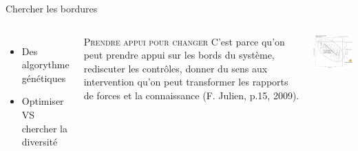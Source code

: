 \documentclass[newPxFont]{beamer}
\begin{document}
\begin{frame}[c]{Chercher les bordures}
  \vspace{-1cm}
  \begin{columns}[onlytextwidth,T]
    \column{\dimexpr\linewidth-30mm-5mm}
        \begin{itemize}
          \item Des algorythme génétiques
          \item Optimiser VS chercher la diversité
        \end{itemize}
        \begin{alertblock}{\textsc{Prendre appui pour changer}}
          C'est parce qu'on peut prendre appui sur les bords du système, rediscuter les contrôles, donner du sens aux intervention qu'on peut transformer les rapports de forces et la connaissance (F. Julien, p.15, 2009).
         \end{alertblock}
    \column{30mm}
    \vspace{0.5cm}
    \includegraphics[width=7cm]{img/pse.png}
  \end{columns}
\end{frame}
\end{document}
